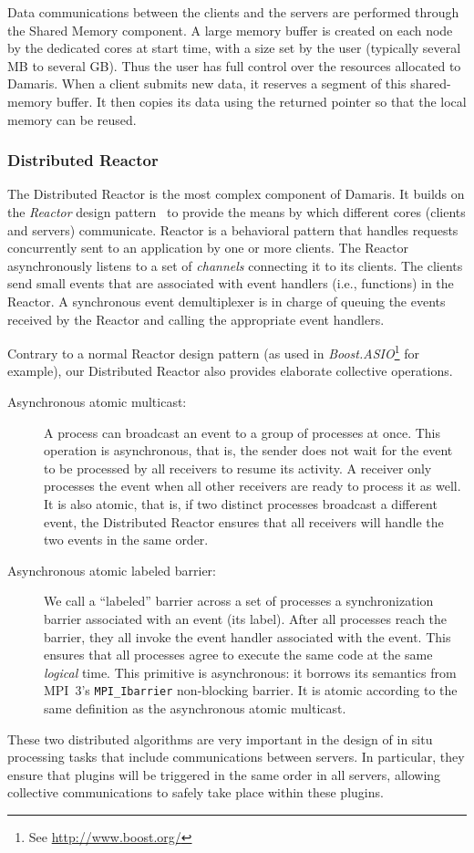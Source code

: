 Data communications between the clients and the servers are
performed through the Shared Memory component. A large
memory buffer is created on each node by the dedicated cores at start time, with a size set by the user 
(typically several MB to several GB). 
Thus the user has full control over the resources allocated to Damaris.
When a client submits new data, it reserves a segment of this shared-memory buffer. 
It then copies its data using the returned pointer so that the local memory can be reused.

\subsubsection{Distributed Reactor}

The Distributed Reactor is the most complex component of Damaris.
It builds on the \emph{Reactor} design pattern~\cite{coplien95reactor} to provide the means 
by which different cores (clients and servers) communicate. 
Reactor is a behavioral pattern that handles requests concurrently sent to an application by one or more clients.
The Reactor asynchronously listens to a set of \emph{channels} connecting it to its clients.
The clients send small events that are associated with event handlers (i.e., functions) in the Reactor.
A synchronous event demultiplexer is in charge of queuing the events received by the Reactor and calling 
the appropriate event handlers.

Contrary to a normal Reactor design pattern (as used in \emph{Boost.ASIO}\footnote{See \url{http://www.boost.org/}} for example), 
our Distributed Reactor also provides elaborate collective operations.
%
\begin{description}
	\item[Asynchronous atomic multicast:] A process can broadcast an event to a group
	of processes at once. This operation is asynchronous, that is, the sender does not wait
	for the event to be processed by all receivers to resume its activity. A receiver
	only processes the event when all other receivers are ready to process it as well.
	It is also atomic, that is, if two distinct processes broadcast a different event, the
	Distributed Reactor ensures that all receivers will handle the two events in the same order.
	
	\item[Asynchronous atomic labeled barrier:] We call a ``labeled'' barrier across a set of
	processes a synchronization barrier associated with an event (its label). After all processes reach the barrier, 
	they all invoke the event handler associated with the event. 
	This ensures that all processes agree to execute the same code at 
	the same \emph{logical} time. This primitive is asynchronous: it borrows its semantics 
	from MPI~3's \texttt{MPI\_Ibarrier} non-blocking barrier.
	It is atomic according to the same definition as the asynchronous atomic multicast.
\end{description}
%
These two distributed algorithms are very important in the design of in situ processing tasks
that include communications between servers. In particular, they ensure that plugins will
be triggered in the same order in all servers, allowing collective communications to safely
take place within these plugins.

